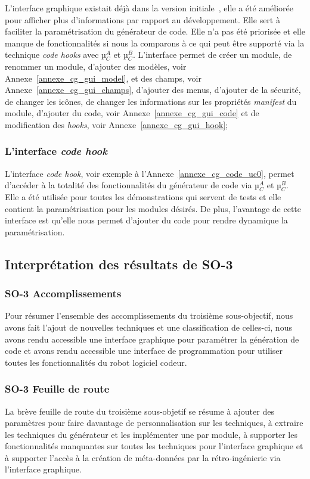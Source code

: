  L'interface graphique existait déjà dans la version initiale~\cite{bluiksnot_repo}, elle a été améliorée pour afficher plus d'informations par rapport au développement. Elle sert à faciliter la paramétrisation du générateur de code. Elle n’a pas été priorisée et elle manque de fonctionnalités si nous la comparons à ce qui peut être supporté via la technique \textit{code hooks} avec µ$_C^A$ et µ$_C^B$. L'interface permet de créer un module, de renommer un module, d'ajouter des modèles, voir Annexe~\ref{annexe_cg_gui_model}, et des champs, voir Annexe~\ref{annexe_cg_gui_champs}, d'ajouter des menus, d'ajouter de la sécurité, de changer les icônes, de changer les informations sur les propriétés \textit{manifest }du module, d'ajouter du code, voir Annexe~\ref{annexe_cg_gui_code} et de modification des \textit{hooks}, voir Annexe~\ref{annexe_cg_gui_hook};

\subsubsection{L'interface \textit{code \textit{hook}}}

L'interface \textit{code \textit{hook}}, voir exemple à l'Annexe~\ref{annexe_cg_code_uc0}, permet d’accéder à la totalité des fonctionnalités du générateur de code via µ$_C^A$ et µ$_C^B$. Elle a été utilisée pour toutes les démonstrations qui servent de tests et elle contient la paramétrisation pour les modules désirés. De plus, l'avantage de cette interface est qu'elle nous permet d'ajouter du code pour rendre dynamique la paramétrisation.

\subsection{Interprétation des résultats de SO-3}

\subsubsection{SO-3 Accomplissements}
Pour résumer l'ensemble des accomplissements du troisième sous-objectif, nous avons fait l'ajout de nouvelles techniques et une classification de celles-ci, nous avons rendu accessible une interface graphique pour paramétrer la génération de code et avons rendu accessible une interface de programmation pour utiliser toutes les fonctionnalités du robot logiciel codeur.

\subsubsection{SO-3 Feuille de route}
La brève feuille de route du troisième sous-objetif se résume à ajouter des paramètres pour faire davantage de personnalisation sur les techniques, à extraire les techniques du générateur et les implémenter une par module, à supporter les fonctionnalités manquantes sur toutes les techniques pour l’interface graphique et à supporter l’accès à la création de méta-données par la rétro-ingénierie via l’interface graphique.

